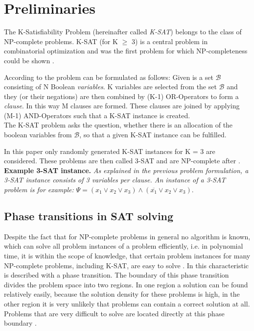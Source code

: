 \section{Preliminaries}

The K-Satisfiability Problem (hereinafter called \emph{K-SAT}) belongs to the class of NP-complete problems. K-SAT (for K $\geq$ 3) is a central problem in combinatorial optimization and was the first problem for which NP-completeness could be shown \cite{mezard2002random}.

According to \cite{mezard2002random} the problem can be formulated as follows:
Given is a set $\mathcal{B}$ consisting of N Boolean \emph{variables}. K variables are selected from the set $\mathcal{B}$ and they (or their negations) are then combined by (K-1) OR-Operators to form a \emph{clause}.
In this way M clauses are formed. These clauses are joined by applying (M-1) AND-Operators such that a K-SAT instance is created.\\The K-SAT problem asks the question, whether there is an allocation of the boolean variables from $\mathcal{B}$, so that a given K-SAT instance can be fulfilled. 

In this paper only randomly generated K-SAT instances for K = 3 are considered. These problems are then called 3-SAT and are NP-complete after \cite{cook1971complexity}.\\

\textbf{Example 3-SAT instance.} \emph{As explained in the previous problem formulation, a 3-SAT instance consists of 3 variables per clause. An instance of a 3-SAT problem is for example:} $\Psi = ( x_{1} \vee x_{2} \vee x_{3}) \wedge ( \overline{x_{1}} \vee x_{2} \vee x_{3})$.\\

\subsection{Phase transitions in SAT solving}
Despite the fact that for NP-complete problems in general no algorithm is known, which can solve all problem instances of a problem efficiently, i.e. in polynomial time, it is within the scope of knowledge, that certain problem instances for many NP-complete problems, including K-SAT, are easy to solve \cite{cheeseman1991really}. In \cite{monasson1999determining} this characteristic is described with a phase transition. The boundary of this phase transition divides the problem space into two regions. In one region a solution can be found relatively easily, because the solution density for these problems is high, in the other region it is very unlikely that problems can contain a correct solution at all. Problems that are very difficult to solve are located directly at this phase boundary \cite{cheeseman1991really}. 

